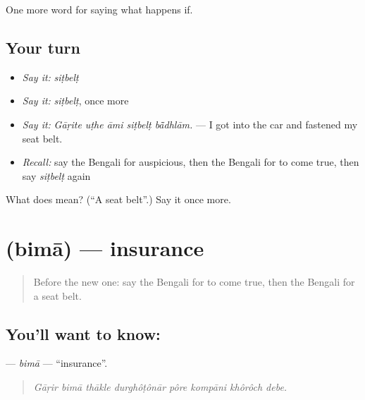\begin{grammarlens}[title={What you've built}]
One more word for saying what happens if.
\end{grammarlens}

\subsection*{Your turn}
\begin{itemize}
\raggedright
  \item \emph{Say it:} \emph{siṭbelṭ}
  \item \emph{Say it:} \emph{siṭbelṭ}, once more
  \item \emph{Say it:} \emph{Gāṛite uṭhe āmi siṭbelṭ bā̃dhlām.} — I got into the car and fastened my seat belt.
  \item \emph{Recall:} say the Bengali for auspicious, then the Bengali for to come true, then say \emph{siṭbelṭ} again
\end{itemize}

\begin{tcolorbox}[breakable,colback=teal!4,colframe=teal!35!black,title={Before you move on}]
What does  mean? (\textquotedblleft{}A seat belt\textquotedblright{}.) Say it once more.
\end{tcolorbox}
\section[\texorpdfstring{\bn{বিমা} (bimā)}{বিমা (bimā)}]{ (bimā) — insurance}

\label{lesson:BN-C535-bima}



\begin{quote}
Before the new one: say the Bengali for to come true, then the Bengali for a seat belt.
\end{quote}

\subsection*{You'll want to know: }
\textbf{} — \emph{bimā} — \textquotedblleft{}insurance\textquotedblright{}.

\begin{quote}
       
\end{quote}

\begin{quote}
\emph{Gāṛir bimā thākle durghôṭônār pôre kompāni khôrôch debe.}
\end{quote}

